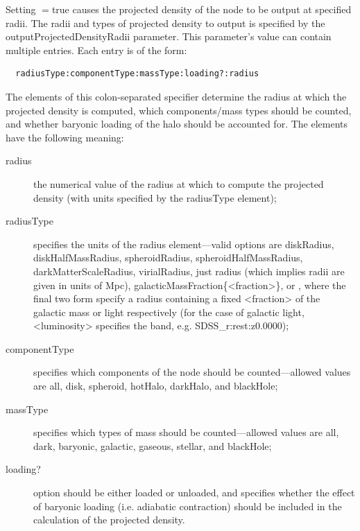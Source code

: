 Setting {\normalfont \ttfamily [outputProjectedDensityData]}$=${\normalfont \ttfamily true} causes the projected density of the node to be output at specified radii. The radii and types of projected density to output is specified by the {\normalfont \ttfamily outputProjectedDensityRadii} parameter. This parameter's value can contain multiple entries. Each entry is of the form:
\begin{verbatim}
  radiusType:componentType:massType:loading?:radius
\end{verbatim}
The elements of this colon-separated specifier determine the radius at which the projected density is computed, which components/mass types should be counted, and whether baryonic loading of the halo should be accounted for. The elements have the following meaning:
\begin{description}
 \item [{\normalfont \ttfamily radius}] the numerical value of the radius at which to compute the projected density (with units specified by the {\normalfont \ttfamily radiusType} element);
 \item [{\normalfont \ttfamily radiusType}] specifies the units of the {\normalfont \ttfamily radius} element---valid options are {\normalfont \ttfamily diskRadius}, {\normalfont \ttfamily diskHalfMassRadius}, {\normalfont \ttfamily spheroidRadius}, {\normalfont \ttfamily spheroidHalfMassRadius}, {\normalfont \ttfamily darkMatterScaleRadius}, {\normalfont \ttfamily virialRadius}, just {\normalfont \ttfamily radius} (which implies radii are given in units of Mpc), {\normalfont \ttfamily galacticMassFraction\{\textless fraction\textgreater\}}, or , where the final two form specify a radius containing a fixed {\normalfont \ttfamily \textless fraction\textgreater} of the galactic mass or light respectively (for the case of galactic light, {\normalfont \ttfamily \textless luminosity\textgreater} specifies the band, e.g. {\normalfont \ttfamily SDSS\_r:rest:z0.0000});
 \item [{\normalfont \ttfamily componentType}] specifies which components of the node should be counted---allowed values are {\normalfont \ttfamily all}, {\normalfont \ttfamily disk}, {\normalfont \ttfamily spheroid}, {\normalfont \ttfamily hotHalo}, {\normalfont \ttfamily darkHalo}, and {\normalfont \ttfamily blackHole};
 \item [{\normalfont \ttfamily massType}] specifies which types of mass should be counted---allowed values are {\normalfont \ttfamily all}, {\normalfont \ttfamily dark}, {\normalfont \ttfamily baryonic}, {\normalfont \ttfamily galactic}, {\normalfont \ttfamily gaseous}, {\normalfont \ttfamily stellar}, and {\normalfont \ttfamily blackHole};
 \item [{\normalfont \ttfamily loading?}] option should be either {\normalfont \ttfamily loaded} or {\normalfont \ttfamily unloaded}, and specifies whether the effect of baryonic loading (i.e. adiabatic contraction) should be included in the calculation of the projected density.
\end{description}

